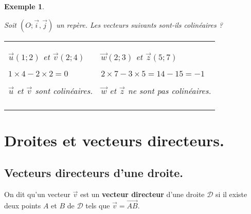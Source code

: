 \documentclass[a4paper,11pt]{article}
\theoremstyle{break}
\newcounter{enonce}
\newtheorem{exemple}[enonce]{Exemple}
\begin{document}
     \begin{exemple}
     ~
  \begin{center}
    Soit $(O;\vec{i},\vec{j})$ un repère. Les vecteurs suivants sont-ils colinéaires ? 
   
   \begin{tabular}{p{4.7cm}|p{4.7cm}}
   
   
$\vec{u}(1;2)$ et $\vec{v}(2;4)$

{$1 \times 4- 2 \times 2 = 0$}

{$\vec{u}$ et $\vec{v}$ sont colinéaires}.

& 

$\vec{w}(2;3)$ et $\vec{z}(5;7)$

{$2 \times 7- 3 \times 5 = 14-15=-1$}

{$\vec{w}$ et $\vec{z}$ ne sont pas colinéaires}.\\
 \\

\end{tabular}
\end{center}
\end{exemple}

\section{Droites et vecteurs directeurs.}
  
  \subsection{Vecteurs directeurs d'une droite.}
  
    
   \begin{definition}
    
   On dit qu'un vecteur $\vec{v}$ est un \textbf{vecteur directeur} d'une droite $\mathcal{D}$ si il existe
   deux points $A$ et $B$ de $\mathcal{D}$ tels que $\vec{v}=\vec{AB}$.
  \end{definition}
  
\end{document}
